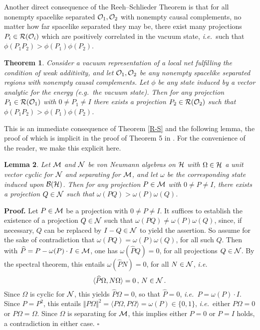 \documentclass[12pt]{article}
\newtheorem{theorem}{Theorem}[section]
\newtheorem{lemma}[theorem]{Lemma}
\newenvironment{proof}{\medskip \noindent 
            {\bf Proof.}}{ \hfill $\square$ \medskip}
\newcommand{\ie}{{\it i.e.\ }}
\newcommand{\eg}{{\it e.g.\ }}
\def\Bs{{\cal B}}
\def\Hs{{\cal H}}
\def\Ms{{\cal M}}
\def\Ns{{\cal N}}
\def\Os{{\cal O}}
\def\Rs{{\cal R}}
\begin{document}
     Another direct consequence of the Reeh--Schlieder Theorem is that
for all nonempty spacelike separated $\Os_1,\Os_2$ with nonempty 
causal complements, no matter how far spacelike separated they may be, 
there exist many projections $P_i \in \Rs(\Os_i)$ which are positively 
correlated in the vacuum state, \ie such that 
$\phi(P_1 P_2) > \phi(P_1) \phi(P_2)$.

\begin{theorem}  \label{mine}
Consider a vacuum representation of a local net fulfilling the condition
of weak additivity, and let $\Os_1,\Os_2$ be any nonempty spacelike separated 
regions with nonempty causal complements. Let $\phi$ be any state induced
by a vector analytic for the energy (\eg the vacuum state). Then for 
any projection $P_1 \in \Rs(\Os_1)$ with $0 \neq P_1 \neq I$ 
there exists a projection 
$P_2 \in \Rs(\Os_2)$ such that $\phi(P_1 P_2) > \phi(P_1) \phi(P_2)$. 
\end{theorem}

     This is an immediate consequence of Theorem \ref{R-S} and the
following lemma, the proof of which is implicit in the proof of
Theorem 5 in \cite{Red}. For the convenience of the reader, we make
this explicit here.

\begin{lemma}
Let $\Ms$ and $\Ns$ be von Neumann algebras on $\Hs$ with $\Omega \in \Hs$
a unit vector cyclic for $\Ns$ and separating for $\Ms$, and let $\omega$ 
be the corresponding state induced upon $\Bs(\Hs)$. Then for any projection
$P \in \Ms$ with $0 \neq P \neq I$, there exists a projection $Q \in \Ns$
such that $\omega(PQ) > \omega(P)\omega(Q)$.
\end{lemma}

\begin{proof}
Let $P \in \Ms$ be a projection with $0 \neq P \neq I$. It suffices 
to establish the existence of a projection $Q \in \Ns$ such that 
$\omega(PQ) \neq \omega(P)\omega(Q)$, since, if necessary, $Q$ can
be replaced by $I - Q \in \Ns$ to yield the assertion. So assume
for the sake of contradiction that
$\omega(PQ) = \omega(P)\omega(Q)$, for all such $Q$. Then with
$\widehat{P} = P - \omega(P) \cdot I \in \Ms$, one has
$\omega(\widehat{P}Q) = 0$, for all projections $Q \in \Ns$. By the 
spectral theorem, this entails $\omega(\widehat{P}N) = 0$, 
for all $N \in \Ns$, \ie
%
$$\langle \widehat{P} \Omega, N \Omega \rangle = 0 \, , \, N \in \Ns \, .$$
%
Since $\Omega$ is cyclic for $\Ns$, this yields $\widehat{P} \Omega = 0$, 
so that $\widehat{P} = 0$, \ie $P = \omega(P) \cdot I$. Since $P = P^2$,
this entails $\Vert P\Omega \Vert^2 = \langle P\Omega, P\Omega\rangle = 
\omega(P) \in \{ 0,1 \}$, 
\ie either $P\Omega = 0$ or $P\Omega = \Omega$. Since $\Omega$ is
separating for $\Ms$, this implies either $P = 0$ or $P = I$ holds, 
a contradiction in either case.
\end{proof}
\end{document}
